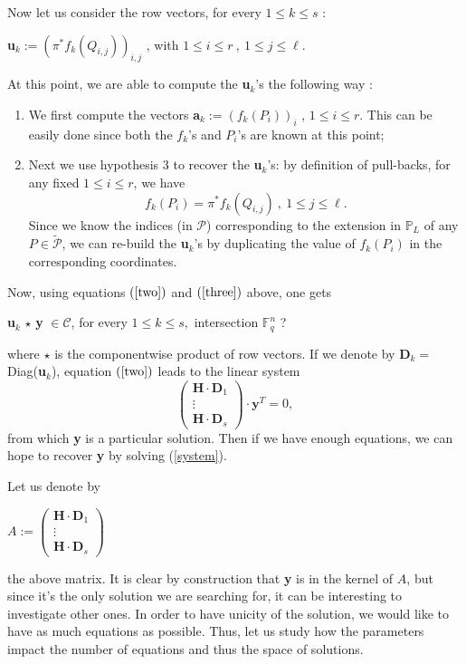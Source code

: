 \documentclass[10pt]{article}
\newcommand{\s}{\vspace{0.3cm}}
\newcommand{\cd}{\cdot}
\newcommand{\PP}{\mathbb{P}}
\newcommand{\fq}{\mathbb{F}_q}
\newcommand{\PR}{\mathcal{P}}
\begin{document}
Now let us consider the row vectors, for every $1 \leq k \leq s$ :
\begin{center}
\textbf{u}$_{k}:= \left(\pi^*f_k(Q_{i,j})\right)_{i,j}$ , with $1 \leq i \leq r \ , \ 1 \leq j \leq \ell$.
\end{center}

At this point, we are able to compute the \textbf{u}$_{k}$'s the following way :
\begin{enumerate}
\item We first compute the vectors \textbf{a}$_{k} := (f_k(P_i))_i$ , $1 \leq i \leq r$. This can be easily done since both the $f_k$'s and $P_i$'s are known at this point;
\item Next we use hypothesis $3$ to recover the \textbf{u}$_{k}$'s: by definition of pull-backs, for any fixed $1 \leq i \leq r$, we have 
\[f_k(P_i) = \pi^*f_k(Q_{i,j}) \ , \ 1 \leq j \leq \ell.\]
Since we know the indices (in $\PR$) corresponding to the extension in $\PP_L$ of any $P \in \tilde{\PR}$, we can re-build the \textbf{u}$_{k}$'s by duplicating the value of $f_k(P_i)$ in the corresponding coordinates.
\end{enumerate}

Now, using equations $(\ref{two})$ and $(\ref{three})$ above, one gets 
\begin{center}
\textbf{u}$_{k}$ $\star$ \textbf{y} $\in \mathcal{C}$, for every $1 \leq k \leq s,$ \color{red} intersection $\fq^n$ ? \color{black}
\end{center}
where $\star$ is the componentwise product of row vectors.
If we denote by \textbf{D}$_{k} = $ Diag(\textbf{u}$_{k}$), equation $(\ref{two})$ leads to the linear system 
\begin{equation} \label{system}
\begin{pmatrix}
\mathbf{H} \cd \textbf{D}_1 \\
\vdots \\
\mathbf{H} \cd \textbf{D}_s
\end{pmatrix}
\cd \textbf{y}^T = 0, 
\end{equation}
from which \textbf{y} is a particular solution.
Then if we have enough equations, we can hope to recover \textbf{y} by solving (\ref{system}). 

\s

 Let us denote by
\begin{center}
$A := \begin{pmatrix}
\mathbf{H} \cd \mathbf{D}_1 \\
\vdots \\
\mathbf{H} \cd \mathbf{D}_s
\end{pmatrix}
$
\end{center}
the above matrix. It is clear by construction that \textbf{y} is in the kernel of $A$, but since it's the only solution we are searching for, it can be interesting to investigate other ones. In order to have unicity of the solution, we would like to have as much equations as possible. Thus, let us study how the parameters impact the number of equations and thus the space of solutions.
\end{document}
